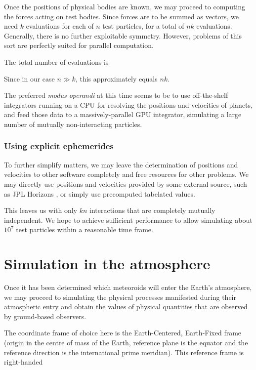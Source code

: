             Once the positions of physical bodies are known, we may proceed to computing the forces acting
            on test bodies. Since forces are to be summed as vectors, we need $k$ evaluations
            for each of $n$ test particles, for a total of $nk$ evaluations.
            Generally, there is no further exploitable symmetry.
            However, problems of this sort are perfectly suited for parallel computation.

            The total number of evaluations is

            Since in our case $n \gg k$, this approximately equals $nk$.

            The preferred \textit{modus operandi} at this time seems to be to use off-the-shelf integrators
            running on a CPU for resolving the positions and velocities of planets, and feed those data
            to a massively-parallel GPU integrator, simulating a large number of mutually non-interacting particles.

        \subsubsection{Using explicit ephemerides} \label{asie}
            To further simplify matters, we may leave the determination of positions and velocities
            to other software completely and free resources for other problems.
            We may directly use positions and velocities provided by some external source,
            such as JPL Horizons \cite{???}, or simply use precomputed tabelated values.

            This leaves us with only $kn$ interactions that are completely mutually independent.
            We hope to achieve sufficient performance to allow simulating about $10^7$ test particles within
            a reasonable time frame.

\section{Simulation in the atmosphere} \label{sa}
    Once it has been determined which meteoroids will enter the Earth's atmosphere, we may proceed to simulating
    the physical processes manifested during their atmospheric entry and obtain the values of physical quantities
    that are observed by ground-based observers.

    The coordinate frame of choice here is the Earth-Centered, Earth-Fixed frame (origin in the centre of mass of the Earth,
    reference plane is the equator and the reference direction is the international prime meridian).
    This reference frame is right-handed

